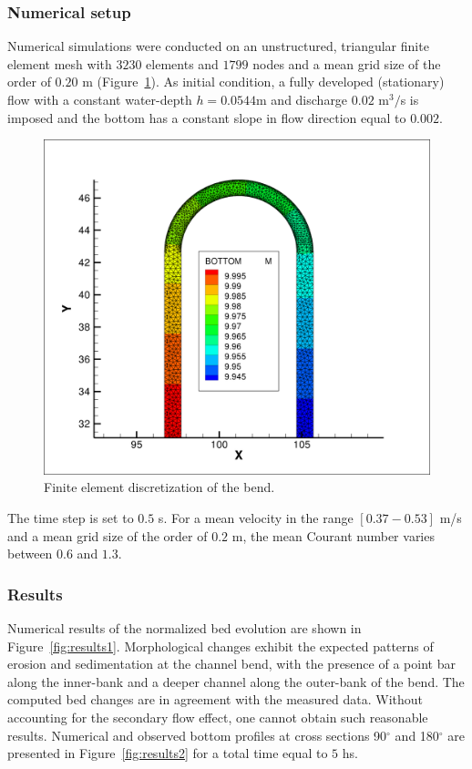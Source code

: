 %
%
\subsubsection{Numerical setup}
%
Numerical simulations were conducted on an unstructured, triangular finite element mesh with
$3230$ elements and $1799$ nodes and a mean grid size of the order of $0.20$ m (Figure~\ref{fig:mesh}). 
As initial condition, a fully developed (stationary) flow with a constant water-depth $h = 0.0544$m and discharge $0.02$ m$^3/$s is imposed and the bottom has a constant slope in flow direction equal to $0.002$. 

\begin{figure} [!h]
\centering
\includegraphics[scale=0.15]{img/yen_grid_bottom.png}
 \caption{Finite element discretization of the bend.}\label{fig:mesh}
\end{figure}

The time step is set to $0.5$ s. For a mean velocity in the range $[0.37-0.53]$ m/s and 
a mean grid size of the order of $0.2$ m, the mean Courant number varies between $0.6$ and $1.3$. 

\subsubsection{Results}
%
Numerical results of the normalized bed evolution are shown in Figure~\ref{fig:results1}. Morphological changes exhibit the expected
patterns of erosion and sedimentation at the channel bend, with the presence of a point bar along the inner-bank and a deeper channel along the outer-bank of the bend.
The computed bed changes are in agreement with the measured data. Without accounting for the secondary flow effect, one cannot obtain such reasonable results.
Numerical and observed bottom profiles at cross sections 90$^{\circ}$ and 180$^{\circ}$ are presented in Figure~\ref{fig:results2} for a total time equal to $5$ hs. 
 
